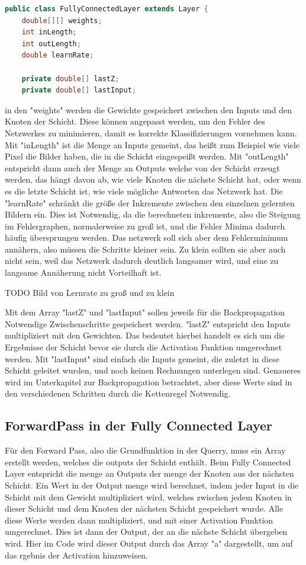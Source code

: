 \documentclass[12pt]{article}
\begin{document}
\begin{lstlisting}[language=Java]
public class FullyConnectedLayer extends Layer {
    double[][] weights;
    int inLength;
    int outLength;
    double learnRate;

    private double[] lastZ;
    private double[] lastInput;
\end{lstlisting} 
in den "weights" werden die Gewichte gespeichert zwischen den Inputs und den Knoten der Schicht. Diese können angepasst werden, um den Fehler des Netzwerkes zu minimieren, damit es korrekte Klassifizierungen vornehmen kann.
Mit "inLength" ist die Menge an Inputs gemeint, das heißt zum Beispiel wie viele Pixel die Bilder haben, die in die Schicht eingespeißt werden.
Mit "outLength" entspricht dann auch der Menge an Outputs welche von der Schicht erzeugt werden, das hängt davon ab, wie viele Knoten die nächste Schicht hat, oder wenn es die letzte Schicht ist, wie viele mögliche Antworten das Netzwerk hat.
Die "learnRate" schränkt die größe der Inkremente zwischen den einzelnen gelernten Bildern ein. Dies ist Notwendig, da die berechneten inkremente, also die Steigung im Fehlergraphen, normalerweise zu groß ist, und die Fehler Minima dadurch häufig übersprungen werden. Das netzwerk soll sich aber dem Fehlerminimum annähern, also müssen die Schritte kleiner sein. Zu klein sollten sie aber auch nicht sein, weil das Netzwerk dadurch deutlich langsamer wird, und eine zu langsame Annäherung nicht Vorteilhaft ist.

TODO Bild von Lernrate zu groß und zu klein

Mit dem Array "lastZ" und "lastInput" sollen jeweils für die Backpropagation Notwendige Zwischenschritte gespeichert werden. "lastZ" entspricht den Inputs multipliziert mit den Gewichten. Das bedeutet hierbei handelt es sich um die Ergebnisse der Schicht bevor sie durch die Activation Funktion umgerechnet werden. Mit "lastInput" sind einfach die Inputs gemeint, die zuletzt in diese Schicht geleitet wurden, und noch keinen Rechnungen unterlegen sind. Genaueres wird im Unterkapitel zur Backpropagation betrachtet, aber diese Werte sind in den verschiedenen Schritten durch die Kettenregel Notwendig.


\subsection{ForwardPass in der Fully Connected Layer}

Für den Forward Pass, also die Grundfunktion in der Querry, muss ein Array erstellt werden, welches die outputs der Schicht enthält. Beim Fully Connected Layer entspricht die menge an Outputs der menge der Knoten aus der nächsten Schicht. Ein Wert in der Output menge wird berechnet, indem jeder Input in die Schicht mit dem Gewicht multipliziert wird, welches zwischen jedem Knoten in dieser Schicht und dem Knoten der nächsten Schicht gespeichert wurde. Alle diese Werte werden dann multipliziert, und mit einer Activation Funktion umgerechnet. Dies ist dann der Output, der an die nächste Schicht übergeben wird. Hier im Code wird dieser Output durch das Array "a" dargestellt, um auf das rgebnis der Activation hinzuweisen.
\end{document}
